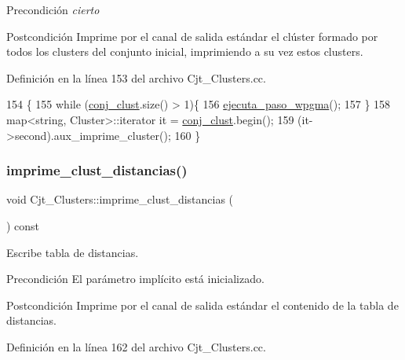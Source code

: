 \begin{DoxyPrecond}{Precondición}
{\itshape cierto} 
\end{DoxyPrecond}
\begin{DoxyPostcond}{Postcondición}
Imprime por el canal de salida estándar el clúster formado por todos los clusters del conjunto inicial, imprimiendo a su vez estos clusters. 
\end{DoxyPostcond}


Definición en la línea 153 del archivo Cjt\+\_\+\+Clusters.\+cc.


\begin{DoxyCode}
154 \{
155     \textcolor{keywordflow}{while} (\hyperlink{class_cjt___clusters_a1202e93aafa953b2dc9a76d03f056b08}{conj\_clust}.size() > 1)\{
156         \hyperlink{class_cjt___clusters_a74ce6f42cecc4c26fea5a6ea21fa4123}{ejecuta\_paso\_wpgma}();
157     \}
158     map<string, Cluster>::iterator it = \hyperlink{class_cjt___clusters_a1202e93aafa953b2dc9a76d03f056b08}{conj\_clust}.begin();
159     (it->second).aux\_imprime\_cluster();
160 \}
\end{DoxyCode}
\mbox{\label{class_cjt___clusters_a3f56a11d83d14d8dc58df32ea70163fa}} 
\subsubsection{\texorpdfstring{imprime\+\_\+clust\+\_\+distancias()}{imprime\_clust\_distancias()}}
{\footnotesize\ttfamily void Cjt\+\_\+\+Clusters\+::imprime\+\_\+clust\+\_\+distancias (\begin{DoxyParamCaption}{ }\end{DoxyParamCaption}) const}



Escribe tabla de distancias. 

\begin{DoxyPrecond}{Precondición}
El parámetro implícito está inicializado. 
\end{DoxyPrecond}
\begin{DoxyPostcond}{Postcondición}
Imprime por el canal de salida estándar el contenido de la tabla de distancias. 
\end{DoxyPostcond}


Definición en la línea 162 del archivo Cjt\+\_\+\+Clusters.\+cc.


